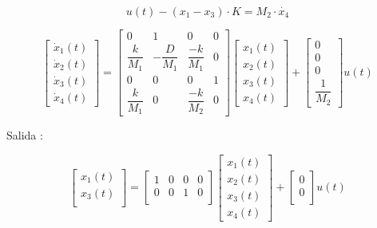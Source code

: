\documentclass[a4paper]{article}
\begin{document}
 \begin{equation}
	u(t) - (x_1 - x_3)\cdot K  = M_2 \cdot \dot{x_4} 
\end{equation}


\begin{equation}
	\begin{bmatrix}
		\dot{x}_1(t) \\
		\dot{x}_2(t) \\
		\dot{x}_3(t) \\
		\dot{x}_4(t)
	\end{bmatrix}
	=
	\begin{bmatrix}
		0 & 1 & 0 & 0\\
		\dfrac{k}{M_1} & -\dfrac{D}{M_1} & \dfrac{-k}{M_1} & 0 \\
		0 & 0 & 0 & 1 \\ 
		\dfrac{k}{M_1} & 0 & \dfrac{-k}{M_2} & 0 
	\end{bmatrix}
	\begin{bmatrix}
		x_1(t) \\
		x_2(t) \\
		x_3(t) \\
		x_4(t)
	\end{bmatrix}
	+
	\begin{bmatrix}
		0 \\
		0 \\
		0 \\
		\dfrac{1}{M_2}
	\end{bmatrix}
	u(t)
\end{equation}


Salida : 




\begin{equation}
	\begin{bmatrix}
		x_1(t) \\
		x_3(t) \\
	\end{bmatrix}
	=
	\begin{bmatrix}
		1 & 0 & 0 & 0\\
		0 & 0 &1 & 0 \\ 
	\end{bmatrix}
	\begin{bmatrix}
		x_1(t) \\
		x_2(t) \\
		x_3(t) \\
		x_4(t)
	\end{bmatrix}
	+
	\begin{bmatrix}
		0 \\
		0 \\
	\end{bmatrix}
	u(t)
\end{equation}
\end{document}
